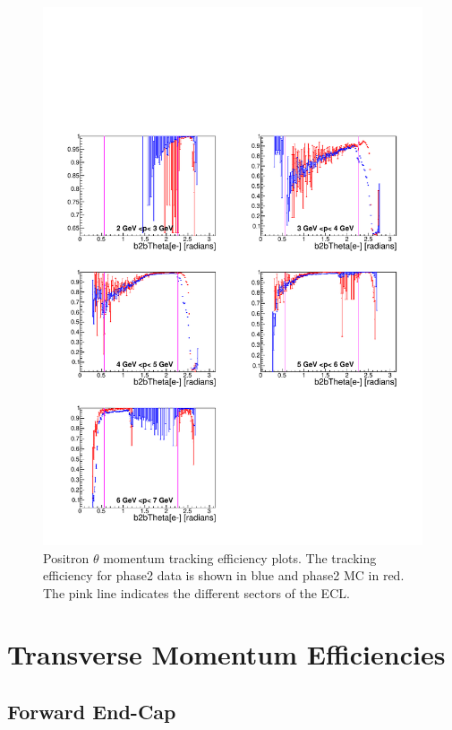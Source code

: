 \documentclass[a4paper,11pt,twosided,final,german,openbib,pdftex,listof=totoc,bibliography=totoc]{scrbook}
\begin{document}
\begin{figure}[!htbp]
	\centering
	\includegraphics[width=\textwidth]{Plots/master/xPMThetaep}
	\caption[Momentum $\theta$ Positron Efficiency Phase2]{Positron $\theta$ momentum tracking efficiency plots. The tracking efficiency for phase2 data is shown in blue and phase2 MC in red. The pink line indicates the different sectors of the ECL.}
	\label{plt:xPMThetaep}
\end{figure}



\clearpage


\section{Transverse Momentum Efficiencies}

\subsection{Forward End-Cap}
\end{document}
